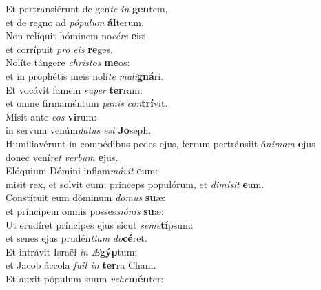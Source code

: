 \oddverse Et pertransiérunt de gen\textit{te} \textit{in} \textbf{gen}tem,~\*\\
\oddverse et de regno ad \textit{pó}\textit{pu}\textit{lum} \textbf{ál}terum.\\
\evenverse Non relíquit hóminem no\textit{cé}\textit{re} \textbf{e}is:~\*\\
\evenverse et corrípuit \textit{pro} \textit{e}\textit{is} \textbf{re}ges.\\
\oddverse Nolíte tángere \textit{chri}\textit{stos} \textbf{me}os:~\*\\
\oddverse et in prophétis meis nolí\textit{te} \textit{ma}\textit{li}\textbf{gná}ri.\\
\evenverse Et vocávit famem \textit{su}\textit{per} \textbf{ter}ram:~\*\\
\evenverse et omne firmaméntum \textit{pa}\textit{nis} \textit{con}\textbf{trí}vit.\\
\oddverse Misit ante \textit{e}\textit{os} \textbf{vi}rum:~\*\\
\oddverse in servum venúm\textit{da}\textit{tus} \textit{est} \textbf{Jo}seph.\\
\evenverse Humiliavérunt in compédibus pedes ejus, ferrum pertránsiit á\textit{ni}\textit{mam} \textbf{e}jus~\*\\
\evenverse donec vení\textit{ret} \textit{ver}\textit{bum} \textbf{e}jus.\\
\oddverse Elóquium Dómini inflam\textit{má}\textit{vit} \textbf{e}um:~\*\\
\oddverse misit rex, et solvit eum; princeps populórum, et \textit{di}\textit{mí}\textit{sit} \textbf{e}um.\\
\evenverse Constítuit eum dóminum \textit{do}\textit{mus} \textbf{su}æ:~\*\\
\evenverse et príncipem omnis posses\textit{si}\textit{ó}\textit{nis} \textbf{su}æ:\\
\oddverse Ut erudíret príncipes ejus sicut \textit{se}\textit{me}\textbf{tí}psum:~\*\\
\oddverse et senes ejus prudén\textit{ti}\textit{am} \textit{do}\textbf{cé}ret.\\
\evenverse Et intrávit Israël \textit{in} \textit{Æ}\textbf{gýp}tum:~\*\\
\evenverse et Jacob áccola \textit{fu}\textit{it} \textit{in} \textbf{ter}ra Cham.\\
\oddverse Et auxit pópulum suum \textit{ve}\textit{he}\textbf{mén}ter:~\*\\
